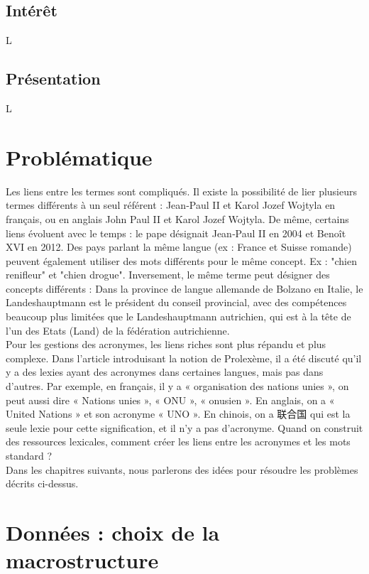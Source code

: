 \documentclass[10pt,a4paper,twoside]{article}
\begin{document}
\subsection{Intérêt}

L

\subsection{Présentation}

L

\section{Problématique}

Les liens entre les termes sont compliqués. Il existe la possibilité de lier plusieurs termes différents à un seul référent : Jean‐Paul II et Karol Jozef Wojtyla en français, ou en anglais John Paul II et Karol Jozef Wojtyla. De même, certains liens évoluent avec le temps : le pape désignait Jean­‐Paul II en 2004 et Benoît XVI en 2012. Des pays parlant la même langue (ex : France et Suisse romande) peuvent également utiliser des mots différents pour le même concept. Ex : "chien renifleur" et "chien drogue". Inversement, le même terme peut désigner des concepts différents : Dans la province de langue allemande de Bolzano en Italie, le Landeshauptmann est le président du conseil provincial, avec des compétences beaucoup plus limitées que le Landeshauptmann autrichien, qui est à la tête de l'un des Etats (Land) de la fédération autrichienne.\\
Pour les gestions des acronymes, les liens riches sont plus répandu et plus complexe. Dans l'article introduisant la notion de Prolexème, il a été discuté qu’il y a des lexies ayant des acronymes dans certaines langues, mais pas dans d'autres. Par exemple, en français, il y a « organisation des nations unies », on peut aussi dire « Nations unies », « ONU », « onusien ». En anglais, on a « United Nations » et son acronyme « UNO ». En chinois, on a 联合国 qui est la seule lexie pour cette signification, et il n’y a pas d’acronyme. Quand on construit des ressources lexicales, comment créer les liens entre les acronymes et les mots standard ?\\
Dans les chapitres suivants, nous parlerons des idées pour résoudre les problèmes décrits ci-dessus. 

\section{Données : choix de la macrostructure}
\end{document}

